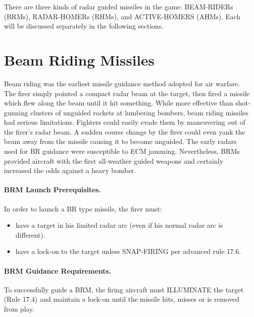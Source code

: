 \label{rule:radar-guided-missiles}

There are three kinds of radar guided missiles in the game: BEAM-RIDERs (BRMs), RADAR-HOMERs (RHMs), and ACTIVE-HOMERS (AHMs). Each will be discussed separately in the following sections.

\section{Beam Riding Missiles}
\label{rule:beam-riding-missiles}

Beam riding was the earliest missile guidance method adopted for air warfare. The firer simply pointed a compact radar beam at the target, then fired a missile which flew along the beam until it hit something. While more effective than shot-gunning clusters of unguided rockets at lumbering bombers, beam riding missiles had serious limitations. Fighters could easily evade them by maneuvering out of the firer's radar beam. A sudden course change by the firer could even yank the beam away from the missile causing it to become unguided. The early radars used for BR guidance were susceptible to ECM jamming. Nevertheless, BRMs provided aircraft with the first all-weather guided weapons and certainly increased the odds against a heavy bomber.

\paragraph{BRM Launch Prerequisites.} In order to launch a BR type missile, the firer must:

\begin{itemize}

    \item have a target in his limited radar arc (even if his normal radar arc is different).

    \item have a lock-on to the target unless SNAP-FIRING per advanced rule 17.6.

\end{itemize}

\paragraph{BRM Guidance Requirements.} To successfully guide a BRM, the firing aircraft must ILLUMINATE the target (Rule 17.4) and maintain a lock-on until the missile hits, misses or is removed from play.

